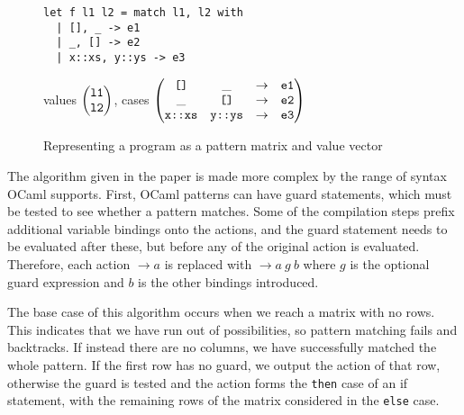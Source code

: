 \begin{figure}[H]
\begin{minipage}{0.45\textwidth}
\begin{verbatim}
let f l1 l2 = match l1, l2 with
  | [], _ -> e1
  | _, [] -> e2
  | x::xs, y::ys -> e3
\end{verbatim}
\end{minipage}
\begin{minipage}{0.55\textwidth}
 values $\begin{pmatrix}
\verb|l1| \\
\verb|l2|
\end{pmatrix}$, cases
$\begin{pmatrix}
\verb|[]| & \_ & \to & \verb|e1| \\
\_ & \verb|[]| & \to & \verb|e2| \\
\verb|x::xs| & \verb|y::ys| & \to & \verb|e3| \\
\end{pmatrix}$
\end{minipage}
\caption{Representing a program as a pattern matrix and value vector}
\end{figure}

The algorithm given in the paper is made more complex by the range of syntax OCaml supports. %
First, OCaml patterns can have guard statements, which must be tested to see whether a pattern matches. Some of the compilation steps prefix additional variable bindings onto the actions, and the guard statement needs to be evaluated after these, but before any of the original action is evaluated. Therefore, each action $\to a$ is replaced with $\to a \ g \ b$ where $g$ is the optional guard expression and $b$ is the other bindings introduced.


The base case of this algorithm occurs when we reach a matrix with no rows. This indicates that we have run out of possibilities, so pattern matching fails and backtracks. If instead there are no columns, we have successfully matched the whole pattern. If the first row has no guard, we output the action of that row, otherwise the guard is tested and the action forms the \verb|then| case of an if statement, with the remaining rows of the matrix considered in the \verb|else| case.


